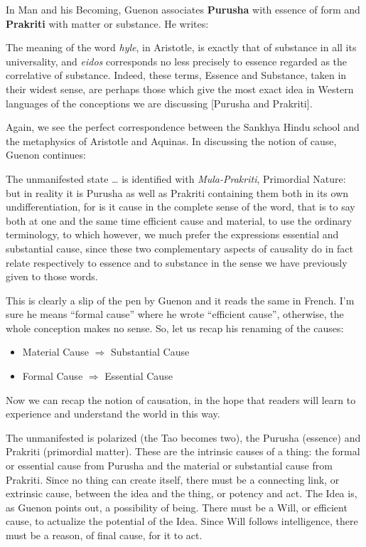 In Man and his Becoming, Guenon associates \textbf{Purusha} with essence of form and \textbf{Prakriti} with matter or substance. He writes:

\begin{quotex}
The meaning of the word \emph{hyle}, in Aristotle, is exactly that of substance in all its universality, and \emph{eidos} corresponds no less precisely to essence regarded as the correlative of substance. Indeed, these terms, Essence and Substance, taken in their widest sense, are perhaps those which give the most exact idea in Western languages of the conceptions we are discussing [Purusha and Prakriti]. 

\end{quotex}
Again, we see the perfect correspondence between the Sankhya Hindu school and the metaphysics of Aristotle and Aquinas. In discussing the notion of cause, Guenon continues:

\begin{quotex}
The unmanifested state … is identified with \emph{Mula-Prakriti}, Primordial Nature: but in reality it is Purusha as well as Prakriti containing them both in its own undifferentiation, for is it cause in the complete sense of the word, that is to say both at one and the same time efficient cause and material, to use the ordinary terminology, to which however, we much prefer the expressions essential and substantial cause, since these two complementary aspects of causality do in fact relate respectively to essence and to substance in the sense we have previously given to those words. 

\end{quotex}
This is clearly a slip of the pen by Guenon and it reads the same in French. I'm sure he means “formal cause” where he wrote “efficient cause”, otherwise, the whole conception makes no sense. So, let us recap his renaming of the causes:

\begin{itemize}
\item Material Cause $\Rightarrow $ Substantial Cause
\item Formal Cause $\Rightarrow $ Essential Cause
\end{itemize}

Now we can recap the notion of causation, in the hope that readers will learn to experience and understand the world in this way.

The unmanifested is polarized (the Tao becomes two), the Purusha (essence) and Prakriti (primordial matter). These are the intrinsic causes of a thing: the formal or essential cause from Purusha and the material or substantial cause from Prakriti. Since no thing can create itself, there must be a connecting link, or extrinsic cause, between the idea and the thing, or potency and act. The Idea is, as Guenon points out, a possibility of being. There must be a Will, or efficient cause, to actualize the potential of the Idea. Since Will follows intelligence, there must be a reason, of final cause, for it to act.

